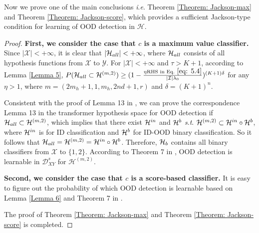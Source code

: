\documentclass{article}
\theoremstyle{plain}
\theoremstyle{definition}
\theoremstyle{remark}
\begin{document}
Now we prove one of the main conclusions \textit{i}.\textit{e}. Theorem \ref{Theorem: Jackson-max} and Theorem \ref{Theorem: Jackson-score}, which provides a sufficient Jackson-type condition for learning of OOD detection in $\mathcal{H}$.
\begin{proof}
    
    \textbf{First, we consider the case that $c$ is a maximum value classifier.}
    Since $|\mathcal{X}| < +\infty$, it is clear that $|\mathcal{H}_{\rm all}| < +\infty$, where $\mathcal{H}_{\rm all}$ consists of all hypothesis functions from $\mathcal{X}$ to $\mathcal{Y}$.
    For $|\mathcal{X}| < +\infty$ and $\tau > K+1$, according to Lemma \ref{Lemma 5}, $P(\mathcal{H}_{\rm all}\subset \mathcal{H}^{(m,2)})\geq (1-\frac{\eta \text{RHS~in~Eq.}~\eqref{eq: 5.4}}{|\mathcal{I}|\lambda_0})^{(K+1)\delta}$ for any $\eta>1$, where $m=(2m_h+1,1,m_h,2nd+1,r)$ and $\delta=(K+1)^n$. 

    Consistent with the proof of Lemma 13 in \citet{fang2022out}, we can prove the correspondence Lemma 13 in the transformer hypothesis space for OOD detection if $\mathcal{H}_{\rm all}\subset \mathcal{H}^{(m,2)}$, which implies that there exist $\mathcal{H}^{\rm in}$ and $\mathcal{H}^{\rm b}$ \textit{s}.\textit{t}. $\mathcal{H}^{(m,2)}\subset \mathcal{H}^{\rm in} \circ \mathcal{H}^{\rm b}$, where $\mathcal{H}^{\rm in}$ is for ID classification and $\mathcal{H}^{\rm b}$ for ID-OOD binary classification. So it follows that $\mathcal{H}_{\rm all}=\mathcal{H}^{(m,2)}=\mathcal{H}^{\rm in} \circ \mathcal{H}^{\rm b}$. Therefore, $\mathcal{H}_{\rm b}$ contains all binary classifiers from $\mathcal{X}$ to $\{1, 2\}$. According to Theorem 7 in \citep{fang2022out}, OOD detection is learnable in $\mathcal{D}_{XY}^s$ for $\mathcal{H}^{(m,2)}$.
    
    \textbf{Second, we consider the case that $c$ is a score-based classifier.}
    It is easy to figure out the probability of which OOD detection is learnable based on Lemma \ref{Lemma 6} and Theorem 7 in \citet{fang2022out}.

    The proof of Theorem \ref{Theorem: Jackson-max} and Theorem \ref{Theorem: Jackson-score} is completed.
\end{proof}
\end{document}

